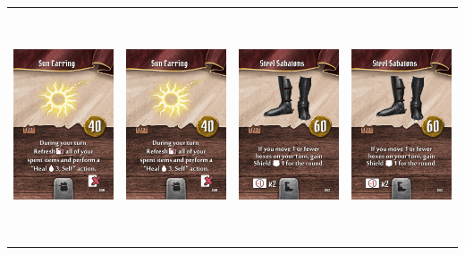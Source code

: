 \documentclass{minimal}
\begin{document}
{\begin{longtable}{llll}
\includegraphics[width=44mm,height=68mm]{./43-49/gh-049-sun-earring.png} &
\includegraphics[width=44mm,height=68mm]{./43-49/gh-049-sun-earring.png} &
\includegraphics[width=44mm,height=68mm]{./50-56/gh-050-steel-sabatons.png} &
\includegraphics[width=44mm,height=68mm]{./50-56/gh-050-steel-sabatons.png}\\ 

\end{longtable}}
\end{document}
